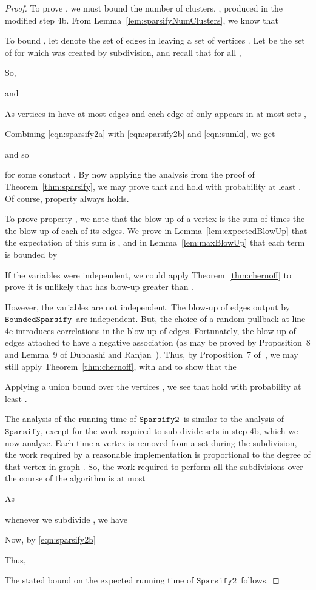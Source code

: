 \documentclass[11pt]{article}
\newcommand{\sparsify}{\ensuremath{\mathtt{Sparsify}}}
\newcommand{\sparsifytwo}{\ensuremath{\mathtt{Sparsify2}}}
\newcommand{\boundedsparsify}{\ensuremath{\mathtt{BoundedSparsify}}}
\begin{document}
\begin{proof}
To prove , we must bound the number of clusters,
  , produced
  in the modified step 4b.
From Lemma~\ref{lem:sparsifyNumClusters}, we know that

To bound , let  denote the set
  of edges in  leaving a set of vertices .
Let  be the set of  for which 
  was created by subdivision,
and recall that for all
  ,

So,

and

As vertices in  have at most  edges
  and
  each edge of  only appears in at most  sets ,

Combining \eqref{eqn:sparsify2a} with \eqref{eqn:sparsify2b}
  and \eqref{eqn:sumki}, we get

and so

for some constant .
By now applying the analysis from the proof of Theorem~\ref{thm:sparsify},
  we may prove that  and  hold with probability
  at least .
Of course, property  always holds.

To prove property ,
  we note that the blow-up of a vertex  is the sum
  of  times the the blow-up of each of its edges.
We prove in Lemma~\ref{lem:expectedBlowUp} that the expectation of this
  sum is , and in Lemma~\ref{lem:maxBlowUp} that each
  term is bounded by

If the variables were independent, we could apply Theorem~\ref{thm:chernoff}
  to prove it is unlikely that
   has blow-up greater than .

However, the variables are not independent.
The blow-up of edges output by \boundedsparsify \ are independent.
But, the choice of a random pullback at line 4e introduces correlations
  in the blow-up of edges.
Fortunately, the blow-up of edges attached to  have a negative association
  (as may be proved by Proposition~8 and Lemma~9 of
  Dubhashi and Ranjan~\cite{DubhashiRanjan}).
Thus, by Proposition~7 of~\cite{DubhashiRanjan}, we may still apply
  Theorem~\ref{thm:chernoff}, with  and  to show that the

Applying a union bound over the vertices , we see that 
  hold with probability at least .

The analysis of the running time of \sparsifytwo \ is similar to
  the analysis of \sparsify, except for the work required to sub-divide
  sets in step 4b, which we now analyze.
Each time a vertex is removed from a set 
  during the subdivision, the work required
  by a reasonable implementation is proportional to the degree
  of that vertex in graph .
So, the work required to perform all the subdivisions over the course
  of the algorithm is at most

As

whenever we subdivide , we have

Now,  by \eqref{eqn:sparsify2b}

Thus,

The stated bound on the expected running time of \sparsifytwo \ follows.
\end{proof}
\end{document}
